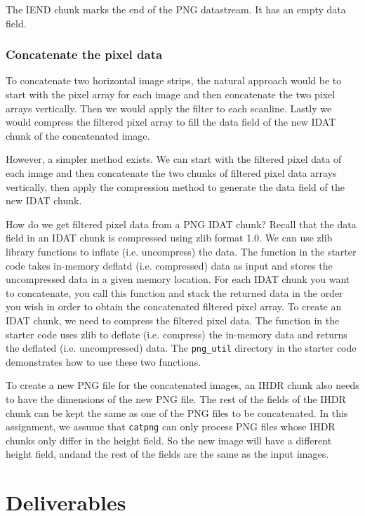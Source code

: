 The IEND chunk marks the end of the PNG datastream. It has an empty data field.

\subsubsection{Concatenate the pixel data}
To concatenate two horizontal image strips, the natural approach would be to start with the pixel array for each image and then concatenate the two pixel arrays vertically. Then we would apply the filter to each scanline. Lastly we would compress the filtered pixel array to fill the data field of the new IDAT chunk of the concatenated image.

However, a simpler method exists. We can start with the filtered pixel data of each image and then concatenate the two chunks of filtered pixel data arrays vertically, then apply the compression method to generate the data field of the new IDAT chunk.

How do we get filtered pixel data from a PNG IDAT chunk? Recall that the data field in an IDAT chunk is compressed using zlib format 1.0. We can use zlib library functions to inflate (i.e. uncompress) the data. The  function in the starter code takes in-memory deflatd (i.e. compressed) data as input and stores the uncompressed data in a given memory location. For each IDAT chunk you want to concatenate, you call this function and stack the returned data in the order you wish in order to obtain the concatenated filtered pixel array. To create an IDAT chunk, we need to compress the filtered pixel data. The  function in the starter code uses zlib to deflate (i.e. compress) the in-memory data and returns the deflated (i.e. uncompressed) data. The \verb+png_util+ directory in the starter code demonstrates how to use these two functions.

To create a new PNG file for the concatenated images, an IHDR chunk also needs to have the dimensions of the new PNG file. The rest of the fields of the IHDR chunk can be kept the same as one of the PNG files to be concatenated. In this assignment, we assume that \verb+catpng+ can only process PNG files whose IHDR chunks only differ in the height field. So the new image will have a different height field, andand  the rest of the fields are the same as the input images.



\section{Deliverables}
